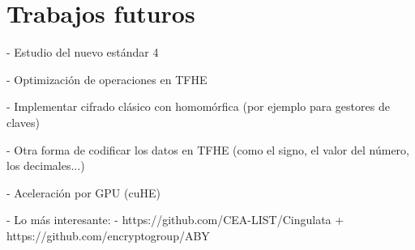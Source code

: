 \chapter{Trabajos futuros}
\label{chap:trabajos_futuros}

- Estudio del nuevo estándar 4

- Optimización de operaciones en TFHE

- Implementar cifrado clásico con homomórfica (por ejemplo para gestores de claves)

- Otra forma de codificar los datos en TFHE (como el signo, el valor del número, los decimales...)

- Aceleración por GPU (cuHE)

- Lo más interesante:
- https://github.com/CEA-LIST/Cingulata + https://github.com/encryptogroup/ABY
